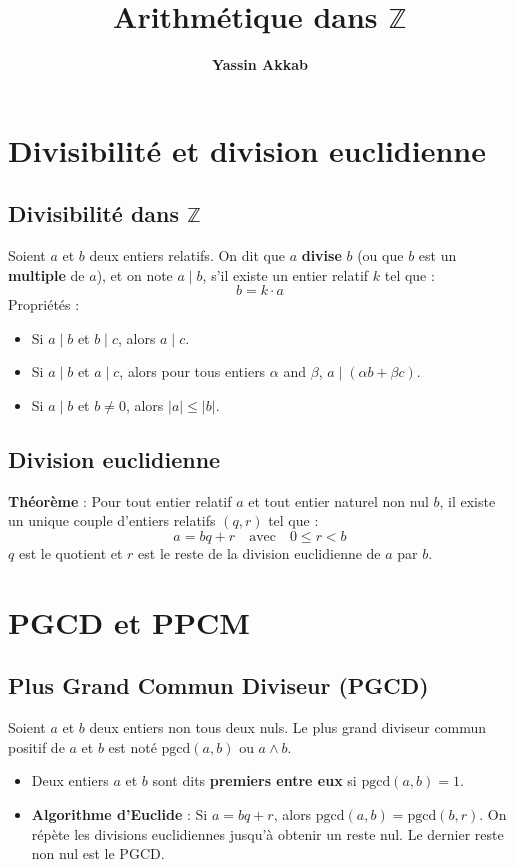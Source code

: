 \documentclass{article}
\title{\textbf{Arithmétique dans $\mathbb{Z}$}}
\author{\textbf{Yassin Akkab}}
\begin{document}
	
	\maketitle
	\tableofcontents
	\newpage
	
	\section{Divisibilité et division euclidienne}
	
	\subsection{Divisibilité dans $\mathbb{Z}$}
	Soient $a$ et $b$ deux entiers relatifs. On dit que $a$ \textbf{divise} $b$ (ou que $b$ est un \textbf{multiple} de $a$), et on note $a \mid b$, s'il existe un entier relatif $k$ tel que :
	\[ b = k \cdot a \]
	Propriétés :
	\begin{itemize}
		\item Si $a \mid b$ et $b \mid c$, alors $a \mid c$.
		\item Si $a \mid b$ et $a \mid c$, alors pour tous entiers $\alpha$ and $\beta$, $a \mid (\alpha b + \beta c)$.
		\item Si $a \mid b$ et $b \ne 0$, alors $|a| \le |b|$.
	\end{itemize}
	
	\subsection{Division euclidienne}
	\textbf{Théorème} : Pour tout entier relatif $a$ et tout entier naturel non nul $b$, il existe un unique couple d'entiers relatifs $(q, r)$ tel que :
	\[ a = bq + r \quad \text{avec} \quad 0 \le r < b \]
	$q$ est le quotient et $r$ est le reste de la division euclidienne de $a$ par $b$.
	
	\section{PGCD et PPCM}
	
	\subsection{Plus Grand Commun Diviseur (PGCD)}
	Soient $a$ et $b$ deux entiers non tous deux nuls. Le plus grand diviseur commun positif de $a$ et $b$ est noté $\text{pgcd}(a, b)$ ou $a \wedge b$.
	\begin{itemize}
		\item Deux entiers $a$ et $b$ sont dits \textbf{premiers entre eux} si $\text{pgcd}(a, b) = 1$.
		\item \textbf{Algorithme d'Euclide} : Si $a = bq + r$, alors $\text{pgcd}(a, b) = \text{pgcd}(b, r)$. On répète les divisions euclidiennes jusqu'à obtenir un reste nul. Le dernier reste non nul est le PGCD.
	\end{itemize}
	
\end{document}
